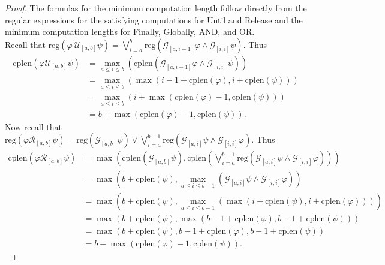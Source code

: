 \documentclass[runningheads]{llncs}
\renewcommand{\phi}{\varphi}
\begin{document}
\vspace{-0.2in}
\begin{proof}
The formulas for the minimum computation length follow directly from the regular expressions for the satisfying computations for Until and Release and the minimum computation lengths for Finally, Globally, AND, and OR.\\
 Recall that $\text{reg}(\phi \ \mathcal{U}_{[a,b]} \psi) =  \bigvee_{i=a}^{b} \text{reg}\left(\mathcal{G}_{[a,i-1]}\phi \land \mathcal{G}_{[i, i]} \psi\right)$. Thus
 \begin{align*}
     \text{cplen}(\phi \mathcal{U}_{[a,b]} \psi) &= \max_{a \leq i \leq b} \left( \text{cplen}(\mathcal{G}_{[a, i-1]} \phi \land \mathcal{G}_{[i,i]} \psi) \right)\\
     &= \max_{a \leq i \leq b} \left( \max(i-1 + \text{cplen}(\phi), i + \text{cplen}(\psi))\right)\\
     &= \max_{a \leq i \leq b} \left(i + \max(\text{cplen}(\phi) - 1, \text{cplen}(\psi))\right)\\
     &= b + \max(\text{cplen}(\phi) - 1, \text{cplen}(\psi)).
 \end{align*}
 \vspace{-0.1in}
 Now recall that $\text{reg}(\phi \mathcal{R}_{[a,b]} \psi) =  \text{reg}\left(\mathcal{G}_{[a,b]}\psi\right) \lor \bigvee_{i=a}^{b-1} \text{reg}\left(\mathcal{G}_{[a,i]}\psi \land \mathcal{G}_{[i, i]} \phi\right)$. Thus%
 \begin{align*}
     \text{cplen}(\phi \mathcal{R}_{[a,b]} \psi) &= \max \left( \text{cplen}(\mathcal{G}_{[a,b]} \psi), \text{cplen}\left( \bigvee_{i=a}^{b-1} \text{reg}\left(\mathcal{G}_{[a,i]}\psi \land \mathcal{G}_{[i, i]} \phi\right) \right)  \right)\\
     &= \max\left( b + \text{cplen}(\psi), \max_{a \leq i \leq b-1} \left(\mathcal{G}_{[a,i]}\psi \land \mathcal{G}_{[i, i]} \phi\right) \right)\\
     &= \max \left( b + \text{cplen}(\psi), \max_{a \leq i \leq b-1} \left(\max(i + \text{cplen}(\psi), i + \text{cplen}(\phi))\right) \right)\\
     &= \max \left( b + \text{cplen}(\psi), \max(b-1+\text{cplen}(\phi), b-1+\text{cplen}(\psi))\right)\\
     &= \max(b + \text{cplen}(\psi), b-1+\text{cplen}(\phi), b-1+\text{cplen}(\psi))\\
     &= b + \max(\text{cplen}(\phi)-1, \text{cplen}(\psi)). 
 \end{align*}
 \end{proof}
\end{document}
